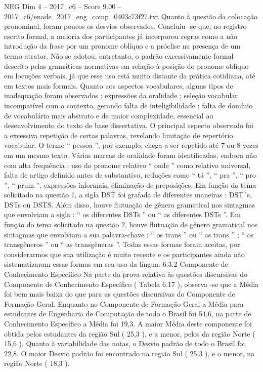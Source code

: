 \begin{textsample}{NEG Dim 4 – 2017\_c6 – Score 9.00 – 2017\_c6/enade\_2017\_eng\_comp\_0403c73f27.txt}
Quanto à questão da colocação pronominal, foram poucos os desvios observados.
Concluiu -se que, no registro escrito formal, a maioria dos participantes já incorporou regras como a não introdução da frase por um pronome oblíquo e a próclise na presença de um termo atrator.
Não se adotou, entretanto, o padrão excessivamente formal descrito pelas gramáticas normativas em relação à posição do pronome oblíquo em locuções verbais, já que esse uso está muito distante da prática cotidiana, até em textos mais formais.
Quanto aos aspectos vocabulares, alguns tipos de inadequação foram observados : expressões da oralidade ; seleção vocabular incompatível com o contexto, gerando falta de inteligibilidade ; falta de domínio de vocabulário mais abstrato e de maior complexidade, essencial ao desenvolvimento do texto de base dissertativa.
O principal aspecto observado foi a excessiva repetição de certas palavras, revelando limitação de repertório vocabular.
O termo “ pessoa ”, por exemplo, chega a ser repetido até 7 ou 8 vezes em um mesmo texto.
Várias marcas de oralidade foram identificadas, embora não com alta frequência : uso do pronome relativo “ onde ” como relativo universal, falta de artigo definido antes de substantivo, reduções como “ tá ”, “ pra ”, “ pro ”, “ prum ”, expressões informais, eliminação de preposições.
Em função do tema solicitado na questão 1, a sigla DST foi grafada de diferentes maneiras : DST´s, DSTs ou DSTS.
Além disso, houve flutuação de gênero gramatical nos sintagmas que envolviam a sigla : “ os diferentes DSTs ” ou “ as diferentes DSTs ”.
Em função do tema solicitado na questão 2, houve flutuação de gênero gramatical nos sintagmas que envolviam a sua palavra-chave : “ os trans ” ou “ as trans ” ; “ os transgêneros ” ou “ as transgêneras ”.
Todas essas formas foram aceitas, por considerarmos que sua utilização é muito recente e os participantes ainda não sistematizaram essas formas em seu uso da língua. 6.3.2 Componente de Conhecimento Específico Na parte da prova relativa às questões discursivas do Componente de Conhecimento Específico ( Tabela 6.17 ), observa -se que a Média foi bem mais baixa do que para as questões discursivas do Componente de Formação Geral.
Enquanto no Componente de Formação Geral a Média para estudantes de Engenharia de Computação de todo o Brasil foi 54,6, na parte de Conhecimento Específico a Média foi 19,3.
A maior Média deste componente foi obtida pelos estudantes da região Sul ( 25,3 ), e a menor, pelos da região Norte ( 15,6 ).
Quanto à variabilidade das notas, o Desvio padrão de todo o Brasil foi 22,8.
O maior Desvio padrão foi encontrado na região Sul ( 25,3 ), e o menor, na região Norte ( 18,3 ).

\end{textsample}
